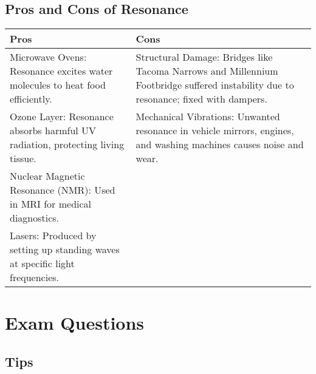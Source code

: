 \documentclass[a4paper,12pt]{article}
\let\oldsection\section
\renewcommand\section{\clearpage\oldsection}
\begin{document}
\pagebreak

\subsection{Pros and Cons of Resonance}

\begin{table}[H]
  \centering

  \def\arraystretch{1.1}
  \begin{tabular}{|p{}|p{}|}\hline
    \rowcolor{Magenta!30!white} \textbf{Pros}                                      & \textbf{Cons}                                                                                                                       \\ \hline
    Microwave Ovens: Resonance excites water molecules to heat food efficiently.   & Structural Damage: Bridges like Tacoma Narrows and Millennium Footbridge suffered instability due to resonance; fixed with dampers. \\ \hline
    Ozone Layer: Resonance absorbs harmful UV radiation, protecting living tissue. & Mechanical Vibrations: Unwanted resonance in vehicle mirrors, engines, and washing machines causes noise and wear.                  \\ \hline
    Nuclear Magnetic Resonance (NMR): Used in MRI for medical diagnostics.         &                                                                                                                                     \\ \hline
    Lasers: Produced by setting up standing waves at specific light frequencies.   &                                                                                                                                     \\ \hline
  \end{tabular}
\end{table}

\pagebreak

\section{Exam Questions}

\subsection{Tips}
\end{document}
